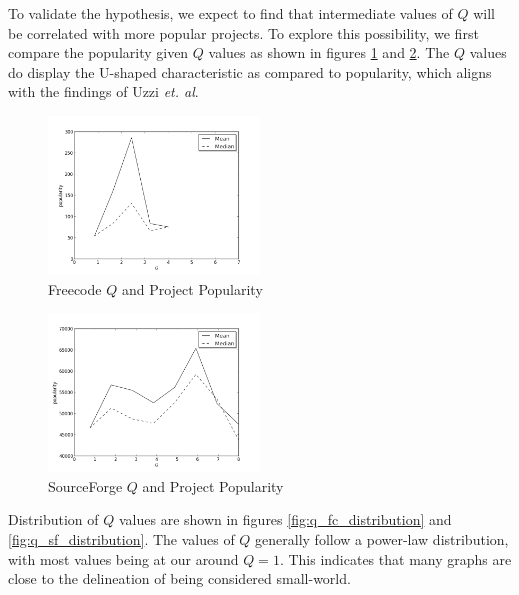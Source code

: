 \documentclass{proc}
\begin{document}
To validate the hypothesis, we expect to find that intermediate values of $Q$ will be correlated with more popular projects. To explore this possibility, we first compare the popularity given $Q$ values as shown in figures \ref{fig:q_fc_graph} and \ref{fig:q_sf_graph}. The $Q$ values do display the U-shaped characteristic as compared to popularity, which aligns with the findings of Uzzi \textit{et. al}\cite{uzzi2005collaboration}.

\begin{figure}
\begin{center}
\includegraphics[width=0.5\textwidth]{images/freecode-graph.png}
\end{center}
\caption{Freecode $Q$ and Project Popularity}
\label{fig:q_fc_graph}
\end{figure}

\begin{figure}
\begin{center}
\includegraphics[width=0.5\textwidth]{images/sf-graph.png}
\end{center}
\caption{SourceForge $Q$ and Project Popularity}
\label{fig:q_sf_graph}
\end{figure}

Distribution of $Q$ values are shown in figures \ref{fig:q_fc_distribution} and \ref{fig:q_sf_distribution}. The values of $Q$ generally follow a power-law distribution, with most values being at our around {$Q = 1$}. This indicates that many graphs are close to the delineation of being considered small-world\cite{humphries2008network}.
\end{document}

